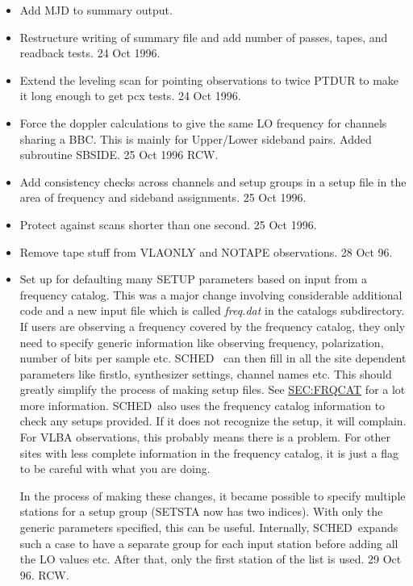 \documentclass{report}
\newcommand{\schedb}{{\sc SCHED~}}
\begin{document}
\begin{itemize}
\item Add MJD to summary output.

\item Restructure writing of summary file and add number of passes,
      tapes, and readback tests.  24 Oct 1996.

\item Extend the leveling scan for pointing observations to twice
      PTDUR to make it long enough to get pcx tests.  24 Oct 1996.

\item Force the doppler calculations to give the same LO frequency for
      channels sharing a BBC.  This is mainly for Upper/Lower
      sideband pairs.  Added subroutine SBSIDE. 25 Oct 1996 RCW.

\item Add consistency checks across channels and setup groups in
      a setup file in the area of frequency and sideband assignments.
      25 Oct 1996.

\item Protect against scans shorter than one second.  25 Oct 1996.

\item Remove tape stuff from VLAONLY and NOTAPE observations. 28 Oct 96.

\item Set up for defaulting many SETUP parameters based on input from
      a frequency catalog.  This was a major change involving
      considerable additional code and a new input file which is
      called {\sl freq.dat} in the catalogs subdirectory.  If users
      are observing a frequency covered by the frequency catalog, they
      only need to specify generic information like observing
      frequency, polarization, number of bits per sample etc.  \schedb
      can then fill in all the site dependent parameters like
      firstlo, synthesizer settings, channel names etc.  This
      should greatly simplify the process of making setup files.
      See \hyperref{the frequency catalog section}{Section }{}
      {SEC:FRQCAT} for a lot more information.  \schedb also uses
      the frequency catalog information to check any setups provided.
      If it does not recognize the setup, it will complain.  For
      VLBA observations, this probably means there is a problem.
      For other sites with less complete information in the frequency
      catalog, it is just a flag to be careful with what you are
      doing.

      In the process of making these changes, it became possible to
      specify multiple stations for a setup group (SETSTA now has two
      indices).  With only the generic parameters specified, this
      can be useful.  Internally, \schedb expands such a case to
      have a separate group for each input station before adding
      all the LO values etc.  After that, only the first station
      of the list is used.      29 Oct 96.  RCW.


\end{itemize}
\end{document}
